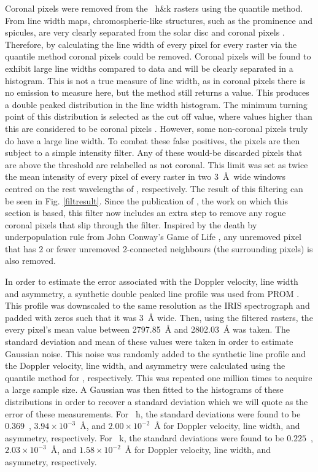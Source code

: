 Coronal pixels were removed from the \mgii~h\&k rasters using the quantile method. From line width maps, chromospheric-like structures, such as the prominence and spicules, are very clearly separated from the solar disc and coronal pixels . Therefore, by calculating the line width of every pixel for every raster via the quantile method coronal pixels could be removed. Coronal pixels will be found to exhibit large line widths compared to data and will be clearly separated in a histogram. This is not a true measure of line width, as in coronal pixels there is no \mgiihk{} emission to measure here, but the method still returns a value. This produces a double peaked distribution in the line width histogram. The minimum turning point of this distribution is selected as the cut off value, where values higher than this are considered to be coronal pixels . However, some non-coronal pixels truly do have a large line width. To combat these false positives, the pixels are then subject to a simple intensity filter. Any of these would-be discarded pixels that are above the threshold are relabelled as not coronal. This limit was set as twice the mean intensity of every pixel of every raster in two 3~\AA\ wide windows centred on the rest wavelengths of \mgiihk, respectively.  The result of this filtering can be seen in Fig. \ref{filtresult}. Since the publication of \cite{peat_solar_2021}, the work on which this section is based, this filter now includes an extra step to remove any rogue coronal pixels that slip through the filter. Inspired by the death by underpopulation rule from John Conway's Game of Life \citep{martin_mathematical_1970}, any unremoved pixel that has 2 or fewer unremoved 2-connected neighbours (the surrounding pixels) is also removed. 

In order to estimate the error associated with the Doppler velocity, line width and asymmetry, a synthetic double peaked line profile was used from PROM . This profile was downscaled to the same resolution as the IRIS spectrograph and padded with zeros such that it was 3~\AA{} wide. Then, using the filtered rasters, the every pixel's mean value between 2797.85~\AA{} and 2802.03~\AA{} was taken. The standard deviation and mean of these values were taken in order to estimate Gaussian noise. This noise was randomly added to the synthetic line profile and the Doppler velocity, line width, and asymmetry were calculated using the quantile method for \mgiihk, respectively. This was repeated one million times to acquire a large sample size. A Gaussian was then fitted to the histograms of these distributions in order to recover a standard deviation which we will quote as the error of these measurements. For \mgii~h, the standard deviations were found to be $0.369$~\kms, $3.94\times10^{-3}$~\AA, and $2.00\times10^{-2}$~\AA{} for Doppler velocity, line width, and asymmetry, respectively. For \mgii~k, the standard deviations were found to be $0.225$~\kms, $2.03\times10^{-3}$~\AA, and $1.58\times10^{-2}$~\AA{} for Doppler velocity, line width, and asymmetry, respectively.

